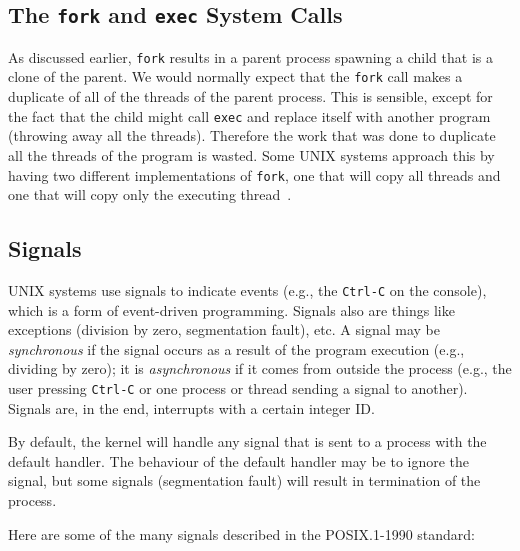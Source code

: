 \subsection*{The \texttt{fork} and \texttt{exec} System Calls} 
As discussed earlier, \texttt{fork} results in a parent process spawning a child that is a clone of the parent. We would normally expect that the \texttt{fork} call makes a duplicate of all of the threads of the parent process. This is sensible, except for the fact that the child might call \texttt{exec} and replace itself with another program (throwing away all the threads). Therefore the work that was done to duplicate all the threads of the program is wasted. Some UNIX systems approach this by having two different implementations of \texttt{fork}, one that will copy all threads and one that will copy only the executing thread~\cite{osc}.


\subsection*{Signals} 

UNIX systems use signals to indicate events (e.g., the \texttt{Ctrl-C} on the console), which is a form of event-driven programming. Signals also are things like exceptions (division by zero, segmentation fault), etc. A signal may be \textit{synchronous} if the signal occurs as a result of the program execution (e.g., dividing by zero); it is \textit{asynchronous} if it comes from outside the process (e.g., the user pressing \texttt{Ctrl-C} or one process or thread sending a signal to another). Signals are, in the end, interrupts with a certain integer ID.

By default, the kernel will handle any signal that is sent to a process with the default handler. The behaviour of the default handler may be to ignore the signal, but some signals (segmentation fault) will result in termination of the process. 


Here are some of the many signals described in the POSIX.1-1990 standard:

